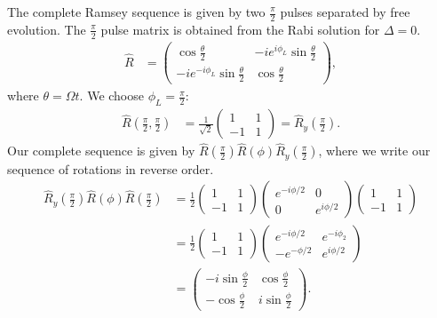 \documentclass[lasers.tex]{subfiles}
\begin{document}
The complete Ramsey sequence is given by two $\frac{\pi}{2}$ pulses separated by free evolution. 
The $\frac{\pi}{2}$ pulse matrix is obtained from the Rabi solution for $\Delta = 0$.
\begin{align}
    \hat{R} &= \begin{pmatrix} \cos\frac{\theta}{2} & -ie^{i\phi_L}\sin\frac{\theta}{2} \\ -ie^{-i\phi_L}\sin\frac{\theta}{2} & \cos\frac{\theta}{2}\end{pmatrix},
\end{align}
where $\theta=\Omega t$.
We choose $\phi_L=\frac{\pi}{2}$:
\begin{align}
    \hat{R}\left(\frac{\pi}{2},\frac{\pi}{2}\right) &= \frac{1}{\sqrt{2}}\begin{pmatrix} 1 & 1 \\ -1 & 1\end{pmatrix} = \hat{R}_y\left(\frac{\pi}{2}\right).
\end{align}
Our complete sequence is given by $\hat{R}\left(\frac{\pi}{2}\right)\hat{R}\left(\phi\right)\hat{R}_y\left(\frac{\pi}{2}\right)$, where we write our sequence of rotations in reverse order. 
\begin{align}
    \hat{R}_y\left(\frac{\pi}{2}\right)\hat{R}(\phi)\hat{R}\left(\frac{\pi}{2}\right) &= \frac12 \begin{pmatrix} 1 & 1 \\ -1 & 1\end{pmatrix}\begin{pmatrix} e^{-i\phi/2} & 0 \\ 0 & e^{i\phi/2}\end{pmatrix} \begin{pmatrix} 1 & 1 \\ -1 & 1\end{pmatrix} \\
                                                                                      &= \frac12 \begin{pmatrix} 1 & 1 \\ -1 & 1\end{pmatrix} \begin{pmatrix} e^{-i\phi/2} & e^{-i\phi_2} \\ -e^{-\phi/2} & e^{i\phi/2}\end{pmatrix} \\
                                                                                      &= \begin{pmatrix} -i\sin\frac{\phi}{2} & \cos\frac{\phi}{2} \\ -\cos\frac{\phi}{2} & i\sin\frac{\phi}{2}\end{pmatrix}.
\end{align}
\end{document}
